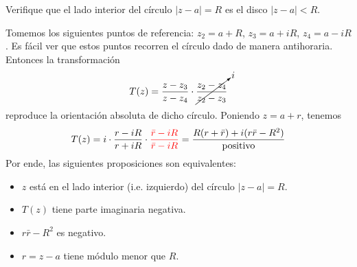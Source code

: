 \begin{exercise}
Verifique que el lado interior del círculo $|z-a| = R$ es el disco $|z-a| < R$.
\end{exercise}

\begin{solution}
Tomemos los siguientes puntos de referencia: $z_2 = a + R$, $z_3 = a + iR$, $z_4 = a - iR$. Es fácil ver que estos puntos recorren el círculo dado de manera antihoraria. Entonces la transformación
$$T(z) = \frac {z - z_3} {z - z_4} \cdot \cancelto i {\frac {z_2 - z_4} {z_2 - z_3}}$$
reproduce la orientación absoluta de dicho círculo. Poniendo $z = a + r$, tenemos
$$T(z)
    = i \cdot \frac {r - iR} {r + iR} \cdot \textcolor {red} {\frac {\bar r - iR} {\bar r - iR}}
    = \frac {R (r + \bar r) + i (r \bar r - R^2)} {\text {positivo}}
$$
Por ende, las siguientes proposiciones son equivalentes:
\begin{itemize}
    \item $z$ está en el lado interior (i.e. izquierdo) del círculo $|z-a| = R$.
    \item $T(z)$ tiene parte imaginaria negativa.
    \item $r \bar r - R^2$ es negativo.
    \item $r = z-a$ tiene módulo menor que $R$.
\end{itemize}
\end{solution}
